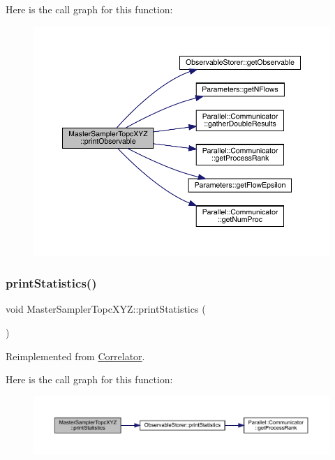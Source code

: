Here is the call graph for this function\+:\nopagebreak
\begin{figure}[H]
\begin{center}
\leavevmode
\includegraphics[width=350pt]{class_master_sampler_topc_x_y_z_ab2312c9e9dc1e9deeb5bce36784372ac_cgraph}
\end{center}
\end{figure}
\mbox{\label{class_master_sampler_topc_x_y_z_a5a34a7f90ce8eea6c0efa06cfdfeb5f1}} 
\subsubsection{\texorpdfstring{printStatistics()}{printStatistics()}}
{\footnotesize\ttfamily void Master\+Sampler\+Topc\+X\+Y\+Z\+::print\+Statistics (\begin{DoxyParamCaption}{ }\end{DoxyParamCaption})\hspace{0.3cm}{\ttfamily [virtual]}}



Reimplemented from \mbox{\hyperlink{class_correlator_a2168d677f547769784781d2e2aaa53cf}{Correlator}}.

Here is the call graph for this function\+:\nopagebreak
\begin{figure}[H]
\begin{center}
\leavevmode
\includegraphics[width=350pt]{class_master_sampler_topc_x_y_z_a5a34a7f90ce8eea6c0efa06cfdfeb5f1_cgraph}
\end{center}
\end{figure}
\mbox{\label{class_master_sampler_topc_x_y_z_aef8d0b1b431711c6410cfece1c007b4a}} 
